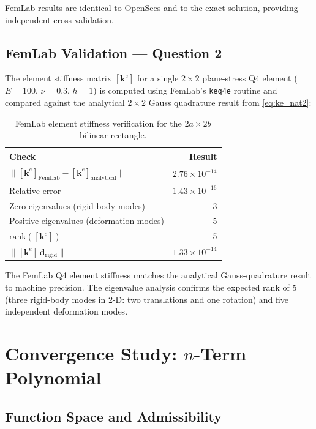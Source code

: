 \documentclass[11pt, a4paper]{article}
\begin{document}
FemLab results are identical to OpenSees and to the exact solution, providing independent cross-validation.

\subsection{FemLab Validation --- Question 2}

The element stiffness matrix $[\mathbf{k}^e]$ for a single $2\times 2$ plane-stress Q4 element ($E=100$, $\nu=0.3$, $h=1$) is computed using FemLab's \texttt{keq4e} routine and compared against the analytical $2\times 2$ Gauss quadrature result from \cref{eq:ke_nat2}:

\begin{table}[H]
\centering
\renewcommand{\arraystretch}{1.3}
\begin{tabular}{@{}l r@{}}
\toprule
\textbf{Check} & \textbf{Result} \\
\midrule
$\|[\mathbf{k}^e]_\text{FemLab}-[\mathbf{k}^e]_\text{analytical}\|$ & $2.76\times 10^{-14}$ \\
Relative error & $1.43\times 10^{-16}$ \\
Zero eigenvalues (rigid-body modes) & 3 \\
Positive eigenvalues (deformation modes) & 5 \\
$\mathrm{rank}([\mathbf{k}^e])$ & 5 \\
$\|[\mathbf{k}^e]\,\mathbf{d}_\text{rigid}\|$ & $1.33\times 10^{-14}$ \\
\bottomrule
\end{tabular}
\caption{FemLab element stiffness verification for the $2a\times 2b$ bilinear rectangle.}
\label{tab:femlab_q2}
\end{table}

The FemLab Q4 element stiffness matches the analytical Gauss-quadrature result to machine precision.  The eigenvalue analysis confirms the expected rank of 5 (three rigid-body modes in 2-D: two translations and one rotation) and five independent deformation modes.

\section{Convergence Study: \texorpdfstring{$n$}{n}-Term Polynomial}\label{sec:convergence}

\subsection{Function Space and Admissibility}
\end{document}
